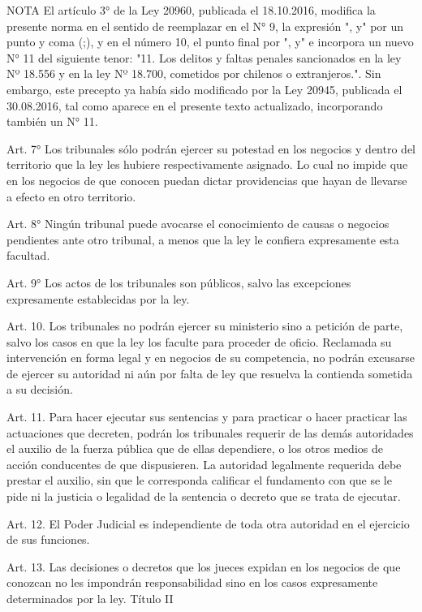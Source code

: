 NOTA
      El artículo 3° de la Ley 20960, publicada el 18.10.2016, modifica la presente norma en el sentido de reemplazar en el N° 9, la expresión ", y" por un punto y coma (;), y en el número 10, el punto final por ", y" e incorpora un nuevo N° 11 del siguiente tenor: "11. Los delitos y faltas penales sancionados en la ley Nº 18.556 y en la ley Nº 18.700, cometidos por chilenos o extranjeros.". Sin embargo, este precepto ya había sido modificado por la Ley 20945, publicada el 30.08.2016, tal como aparece en el presente texto actualizado, incorporando también un N° 11.

    Art. 7° Los tribunales sólo podrán ejercer su potestad en los negocios y dentro del territorio que la ley les hubiere respectivamente asignado.
    Lo cual no impide que en los negocios de que conocen puedan dictar providencias que hayan de llevarse a efecto en otro territorio.

    Art. 8° Ningún tribunal puede avocarse el conocimiento de causas o negocios pendientes ante otro tribunal, a menos que la ley le confiera expresamente esta facultad.

    Art. 9° Los actos de los tribunales son públicos, salvo las excepciones expresamente establecidas por la ley.

    Art. 10. Los tribunales no podrán ejercer su ministerio sino a petición de parte, salvo los casos en que la ley los faculte para proceder de oficio.
    Reclamada su intervención en forma legal y en negocios de su competencia, no podrán excusarse de ejercer su autoridad ni aún por falta de ley que resuelva la contienda sometida a su decisión.

    Art. 11. Para hacer ejecutar sus sentencias y para practicar o hacer practicar las actuaciones que decreten, podrán los tribunales requerir de las demás autoridades el auxilio de la fuerza pública que de ellas dependiere, o los otros medios de acción conducentes de que dispusieren.
    La autoridad legalmente requerida debe prestar el auxilio, sin que le corresponda calificar el fundamento con que se le pide ni la justicia o legalidad de la sentencia o decreto que se trata de ejecutar.


    Art. 12. El Poder Judicial es independiente de toda otra autoridad en el ejercicio de sus funciones.

    Art. 13. Las decisiones o decretos que los jueces expidan en los negocios de que conozcan no les impondrán responsabilidad sino en los casos expresamente determinados por la ley.
    Título II

